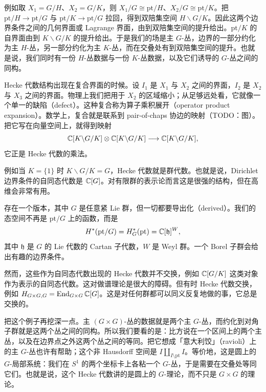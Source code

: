 例如取 $X_1=G/H$、$X_2=G/K$，则 $X_1/G\cong\mathrm{pt}/H$、$X_2/G\cong\mathrm{pt}/K$。把 $\mathrm{pt}/H\to\mathrm{pt}/G$ 与 $\mathrm{pt}/K\to\mathrm{pt}/G$ 拉回，得到双陪集空间 $H\backslash G/K$。因此这两个边界条件之间的几何界面或 Lagrange 界面，由到双陪集空间的提升给出。$\mathrm{pt}/K$ 的自界面由到 $K\backslash G/K$ 的提升给出。于是我们的场是主 $G$-丛，边界的一部分约化为主 $H$-丛，另一部分约化为主 $K$-丛，而在交叠处有到双陪集空间的提升。也就是说，我们同时有一份 $H$-丛数据与一份 $K$-丛数据，以及它们诱导的 $G$-丛之间的同构。

Hecke 代数结构出现在复合界面的时候。设 $I_1$ 是 $X_1$ 与 $X_2$ 之间的界面，$I_2$ 是 $X_2$ 与 $X_3$ 之间的界面。物理上我们把用于 $X_2$ 的区域缩小；从足够远处看，它就像一个单一的缺陷（defect）。这种复合称为算子乘积展开（operator product expansion）。数学上，复合就是联系到 pair-of-chaps 协边的映射（TODO：图）。把它写在向量空间上，就得到映射
\[
\mathbb{C}[K\backslash G/K]\otimes\mathbb{C}[K\backslash G/K]\longrightarrow\mathbb{C}[K\backslash G/K],
\]
它正是 Hecke 代数的乘法。

例如当 $K=\{1\}$ 时 $K\backslash G/K=G$，Hecke 代数就是群代数。也就是说，Dirichlet 边界条件的自同态代数是 $\mathbb{C}[G]$。对有限群的表示论而言这是很强的结构，但在高维会非常有用。

\begin{remark}
存在一个版本，其中 $G$ 是任意紧 Lie 群，但一切都要导出化（derived）。我们的态空间不再是 $\mathrm{pt}/G$ 上的函数，而是
\[
H^*(\mathrm{pt}/G)=H^*_G(\mathrm{pt})=\mathbb{C}[\mathfrak h]^W,
\]
其中 $\mathfrak h$ 是 $G$ 的 Lie 代数的 Cartan 子代数，$W$ 是 Weyl 群。一个 Borel 子群会给出有趣的边界条件。
\end{remark}

然而，这些作为自同态代数出现的 Hecke 代数并不交换，例如 $\mathbb{C}[G/K]$ 这类对象作为表示的自同态代数。这对做谱理论是很大的障碍。但有时 Hecke 代数交换，例如 $H_{G\times G,G}=\operatorname{End}_{G\times G}\mathbb{C}[G]$。这是对任何群都可以同义反复地做的事，它总是交换的。


把这个例子再挖深一点。主 $(G\times G)$-丛的数据就是两个主 $G$-丛，而约化到对角子群就是这两个丛之间的同构。所以我们要看的是：比方说在一个区间上的两个主丛，以及在边界点之外这两个丛之间的等同。把它想成「意大利饺」（ravioli）上的主 $G$-丛也许有帮助；这个非 Hausdorff 空间是 $I\amalg_{I\setminus\mathrm{pt}}I$。等价地，这是圆上的 $G$-局部系统：我们在 $S^1$ 的两个坐标卡上各粘一个 $G$-丛，于是需要在交叠处等同它们。也就是说，这个 Hecke 代数讲的是圆上的 $G$-理论，而不只是 $G\times G$ 的理论。


